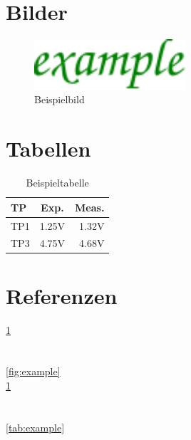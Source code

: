 \documentclass[a4paper, 10pt, fleqn]{article}
\begin{document}
\newpage

\section{Bilder}
\begin{figure}[h!]
    \centering
    \includegraphics[width=0.5\textwidth] {../fig/example.pdf}
    \caption{Beispielbild}
    \label{fig:example}
\end{figure}

\newpage

\section{Tabellen}
\begin{table}[h!]
    \centering
    \begin{tabular}{l|c|r}
        TP  & Exp.  & Meas. \\
        \hline
        TP1 & 1.25V & 1.32V \\
        TP3 & 4.75V & 4.68V \\
    \end{tabular}
    \caption{Beispieltabelle}
    \label{tab:example}
\end{table}

\newpage

\section{Referenzen}

\ref{fig:example} \\
\pageref{fig:example} \\
 \\
\autoref{fig:example} \\
\ref{tab:example} \\
\pageref{tab:example} \\
 \\
\autoref{tab:example} \\
\end{document}
